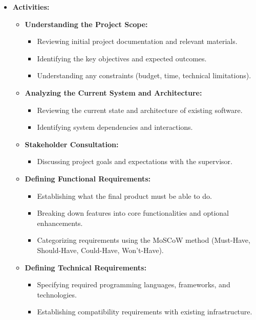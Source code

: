 \documentclass{article}
\begin{document}
\begin{itemize}[leftmargin=*, label={}]
    \item \textbf{Activities:}
    \begin{itemize}
        \item \textbf{Understanding the Project Scope:}
        \begin{itemize}
            \item Reviewing initial project documentation and relevant materials.
            \item Identifying the key objectives and expected outcomes.
            \item Understanding any constraints (budget, time, technical limitations).
        \end{itemize}
        \item \textbf{Analyzing the Current System and Architecture:}
        \begin{itemize}
            \item Reviewing the current state and architecture of existing software.
            \item Identifying system dependencies and interactions.
        \end{itemize}
        \item \textbf{Stakeholder Consultation:}
        \begin{itemize}
            \item Discussing project goals and expectations with the supervisor.
        \end{itemize}
        \item \textbf{Defining Functional Requirements:}
        \begin{itemize}
            \item Establishing what the final product must be able to do.
            \item Breaking down features into core functionalities and optional enhancements.
            \item Categorizing requirements using the MoSCoW method (Must-Have, Should-Have, Could-Have, Won't-Have).
        \end{itemize}
        \item \textbf{Defining Technical Requirements:}
        \begin{itemize}
            \item Specifying required programming languages, frameworks, and technologies.
            \item Establishing compatibility requirements with existing infrastructure.

\end{itemize}
\end{itemize}
\end{itemize}
\end{document}
